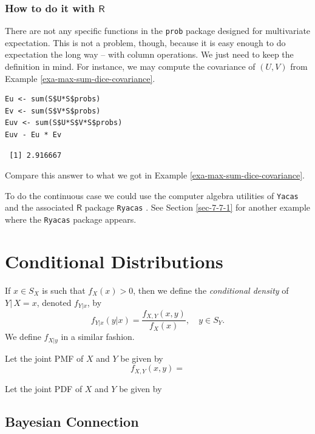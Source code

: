 \documentclass[captions=tableheading]{scrbook}
\begin{document}
\subsubsection{How to do it with \(\mathsf{R}\)}
\label{sec-7-2-1-1}


There are not any specific functions in the \texttt{prob} package designed for multivariate expectation. This is not a problem, though, because it is easy enough to do expectation the long way -- with column operations. We just need to keep the definition in mind. For instance, we may compute the covariance of \((U,V)\) from Example \ref{exa-max-sum-dice-covariance}.


\begin{verbatim}
Eu <- sum(S$U*S$probs)
Ev <- sum(S$V*S$probs)
Euv <- sum(S$U*S$V*S$probs)
Euv - Eu * Ev
\end{verbatim}

\begin{verbatim}
 [1] 2.916667
\end{verbatim}

Compare this answer to what we got in Example \ref{exa-max-sum-dice-covariance}.

To do the continuous case we could use the computer algebra utilities of \texttt{Yacas} and the associated \(\mathsf{R}\) package \texttt{Ryacas} \cite{ryacas}. See Section \ref{sec-7-7-1} for another example where the \texttt{Ryacas} package appears.
\section{Conditional Distributions}
\label{sec-7-3}
\label{sec-Conditional-Distributions}


If \(x\in S_{X}\) is such that \(f_{X}(x)>0\), then we define the \emph{conditional density} of \(Y|\, X=x\), denoted \(f_{Y|x}\), by 
\begin{equation}
f_{Y|x}(y|x)=\frac{f_{X,Y}(x,y)}{f_{X}(x)},\quad y\in S_{Y}.
\end{equation}
We define \(f_{X|y}\) in a similar fashion.

\begin{example}
Let the joint PMF of \(X\) and \(Y\) be given by
\[
f_{X,Y}(x,y)=
\]
\end{example}

\begin{example}
Let the joint PDF of \(X\) and \(Y\) be given by
\end{example}
\subsection{Bayesian Connection}
\label{sec-7-3-1}
\end{document}
